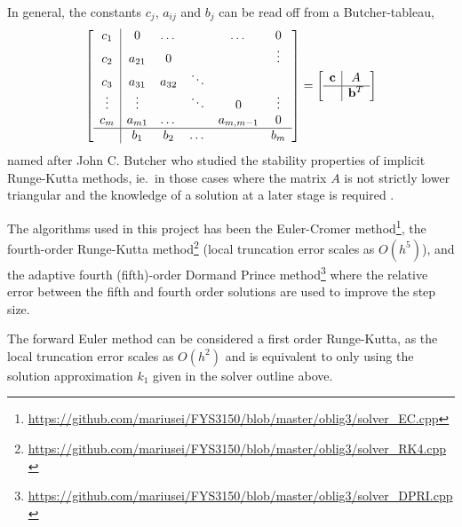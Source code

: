 \documentclass[a4paper,11pt]{article}
\begin{document}
In general, the constants $c_j$, $a_{ij}$ and $b_j$ can be read off from a Butcher-tableau, 
\begin{equation}
    \begin{bmatrix}
        \begin{array}{c | c c c c c}
            c_1     & 0     & \dots&        &\dots& 0 \\
            c_2     & a_{21}&0     &        &   & \vdots \\
            c_3     & a_{31}&a_{32}& \ddots &   & \\
            \vdots  & \vdots&      & \ddots & 0 & \vdots \\
            c_m     & a_{m1}& \dots&        &  a_{m,m-1} & 0 \\
            \hline
                    & b_1   & b_2  & \dots  &         & b_m
        \end{array}
    \end{bmatrix}
    = 
    \begin{bmatrix}
        \begin{array}{c | c}
            \mathbf{c}  &  A \\
            \hline
                        &  \mathbf{b}^T
        \end{array}
    \end{bmatrix}
    \label{eq:butcher}
\end{equation}
named after John C. Butcher who studied the stability properties of implicit Runge-Kutta methods, ie.~in those cases where the matrix $A$ is not strictly lower triangular and the knowledge of a solution at a later stage is required \cite{Butcher:1975}.

The algorithms used in this project has been the Euler-Cromer method\footnote{\url{https://github.com/mariusei/FYS3150/blob/master/oblig3/solver_EC.cpp}}, the fourth-order Runge-Kutta method\footnote{\url{https://github.com/mariusei/FYS3150/blob/master/oblig3/solver_RK4.cpp}} (local truncation error scales as $O(h^5)$), and the adaptive fourth (fifth)-order Dormand Prince method\footnote{\url{https://github.com/mariusei/FYS3150/blob/master/oblig3/solver_DPRI.cpp}} where the relative error between the fifth and fourth order solutions are used to improve the step size.

The forward Euler method can be considered a first order Runge-Kutta, as the local truncation error scales as $O(h^2)$ and is equivalent to only using the solution approximation $k_1$ given in the solver outline above.
\end{document}
